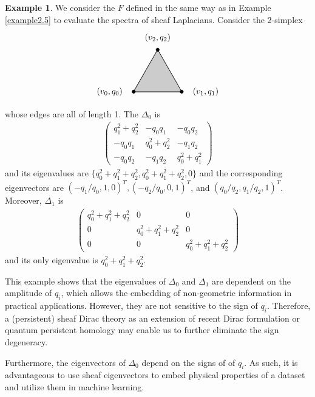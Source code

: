 \documentclass[11pt]{article}
\theoremstyle{definition}
\theoremstyle{definition}
\newtheorem{example}{Example}[section]
\begin{document}
\begin{example}
    We consider the $F$ defined in the same way as in Example \ref{example2.5} to evaluate the spectra of sheaf Laplacians.
    Consider the 2-simplex
    \[
        \begin{tikzpicture}
            \centering
            \draw[thick] (0,0) -- (2,0) -- (1, 1.732) -- (0,0);
            \draw[fill=black!20!white] (0,0) -- (2,0) -- (1, 1.732) -- (0,0);
            \node at (-1,0) {$(v_0, q_0)$};
            \node at (3,0) {$(v_1, q_1)$};
            \node at (1,2.232) {$(v_2, q_2)$};
            \draw[fill=black] (0,0) circle (2pt);
            \draw[fill=black] (1,1.732) circle (2pt);
            \draw[fill=black] (2,0) circle (2pt);
        \end{tikzpicture}
    \] 
    whose edges are all of length 1. The $\Delta_0$ is 
    \begin{align*}
        \begin{pmatrix}
            q_1^2+q_2^2 & -q_0q_1 & -q_0q_2 \\
            -q_0q_1  & q_0^2+q_2^2  & -q_1q_2 \\
            -q_0q_2 & -q_1q_2 & q_0^2+q_1^2
        \end{pmatrix}        
    \end{align*}
    and its eigenvalues are $\{ q_0^2+q_1^2+q_2^2, q_0^2+q_1^2+q_2^2, 0 \}$  and  the corresponding eigenvectors are
    $(-q_1/q_0, 1, 0)^T, (-q_2/q_0, 0, 1)^T$, and $(q_0/q_2, q_1/q_2, 1)^T$.   
Moreover,     $\Delta_1$ is 
    \begin{align*}
        \begin{pmatrix}
            q_0^2+q_1^2+q_2^2 & 0 & 0 \\
            0 & q_0^2+q_1^2+q_2^2 & 0 \\
            0 & 0 & q_0^2+q_1^2+q_2^2
        \end{pmatrix}        
    \end{align*}
    and its only eigenvalue is $q_0^2+q_1^2+q_2^2$. 

This example shows that the eigenvalues of 	$\Delta_0$ and 	$\Delta_1$ are  dependent on the amplitude of $q_i$, which allows the embedding of non-geometric information  in practical applications. 
However, they are not sensitive to the sign of $q_i$. 
Therefore, a (persistent) sheaf Dirac theory as an extension of recent Dirac formulation or quantum persistent homology \cite{ameneyro2022quantum} may enable us to further eliminate the sign degeneracy.      
		
Furthermore, the eigenvectors of $\Delta_0$ depend on the signs of  of $q_i$. 
As such, { it is advantageous to use sheaf eigenvectors to embed physical properties of a dataset and utilize them in machine learning. }
		
		
\end{example}
\end{document}
